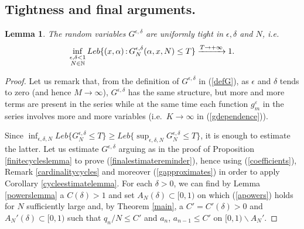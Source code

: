 \documentclass{conm-p-l}
\numberwithin{equation}{section}
\newtheorem{lemma}[theorem]{Lemma}
\begin{document}
\subsection{Tightness and final arguments.}
\begin{lemma}\label{tightness}
The random variables $G^{\epsilon,\delta}$ are uniformly tight in $\epsilon, \delta$ and $N$, i.e.
\begin{equation*}
\inf_{\begin{subarray}{c}  \epsilon, \delta<1\\ N\in \mathbb{N}\end{subarray}} Leb \{ (x,\alpha){\, : \, }  G_N^{\epsilon,\delta} (\alpha ,x,  N) \leq T \} \xrightarrow{T \rightarrow +\infty} 1.
\end{equation*}
\end{lemma}
\begin{proof}
Let us remark that, from the definition of  $G^{\epsilon,\delta}$ in (\ref{defG}), as $\epsilon$ and $\delta$ tends to zero (and hence $M \rightarrow \infty$), $G^{\epsilon,\delta}$ has the same structure, but more and more terms are present in the series while at the same time each function $g_m^{\varepsilon}$ in the series involves more and more variables (i.e.~$K\rightarrow \infty$ in (\ref{gdependence})).

Since $\inf_{\epsilon,\delta, N}Leb\{ G_N^{\epsilon,\delta}
\leq  T \} \geq Leb\{ \sup_{\epsilon,\delta, N}G_N^{\epsilon,\delta}\leq T \} $, it is enough to estimate the latter. 
Let us estimate $G^{\epsilon,\delta}$  arguing as in the proof of Proposition \ref{finitecycleslemma} to prove (\ref{finalestimatereminder}), hence using (\ref{coefficients}),  Remark \ref{cardinalitycycles} and moreover (\ref{gapproximates}) in order to apply Corollary \ref{cycleestimatelemma}. For each $\delta>0$, we can find by Lemma \ref{powerslemma} a $C(\delta)>1$ and set  $A_N(\delta) \subset[0,1)$ on which (\ref{apowers}) holds for $N$ sufficiently large and, by  Theorem \ref{main},  a $C'=C'(\delta)>0$ and $A_N'(\delta)\subset[0,1)$ such that $q_{n}/N \leq C'$ and $a_n$, $a_{n-1}\leq C'$ on $[0,1)\backslash A_N'$.


\end{proof}
\end{document}
